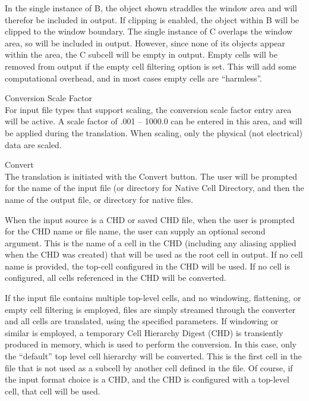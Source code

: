 \begin{description}
In the single instance of B, the object shown straddles the window
area and will therefor be included in output.  If clipping is enabled,
the object within B will be clipped to the window boundary.  The
single instance of C overlaps the window area, so will be included in
output.  However, since none of its objects appear within the area,
the C subcell will be empty in output.  Empty cells will be removed
from output if the empty cell filtering option is set.  This will add
some computational overhead, and in most cases empty cells are
``harmless''.

\item{\cb Conversion Scale Factor}\\
For input file types that support scaling, the conversion scale factor
entry area will be active.  A scale factor of .001 -- 1000.0 can be
entered in this area, and will be applied during the translation. 
When scaling, only the physical (not electrical) data are scaled.

\item{\cb Convert}\\
The translation is initiated with the {\cb Convert} button.  The user
will be prompted for the name of the input file (or directory for {\cb
Native Cell Directory}, and then the name of the output file, or
directory for native files.

When the input source is a CHD or saved CHD file, when the user is
prompted for the CHD name or file name, the user can supply an
optional second argument.  This is the name of a cell in the CHD
(including any aliasing applied when the CHD was created) that will be
used as the root cell in output.  If no cell name is provided, the
top-cell configured in the CHD will be used.  If no cell is
configured, all cells referenced in the CHD will be converted.

If the input file contains multiple top-level cells, and no windowing,
flattening, or empty cell filtering is employed, files are simply
streamed through the converter and all cells are translated, using the
specified parameters.  If windowing or similar is employed, a
temporary Cell Hierarchy Digest (CHD) is transiently produced in
memory, which is used to perform the conversion.  In this case, only
the ``default'' top level cell hierarchy will be converted.  This is
the first cell in the file that is not used as a subcell by another
cell defined in the file.  Of course, if the input format choice is a
CHD, and the CHD is configured with a top-level cell, that cell will
be used.
\end{description}


